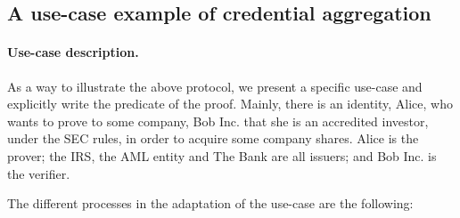 \subsection{A use-case example of credential aggregation}


\paragraph{Use-case description.}
As a way to illustrate the above protocol, we present a specific use-case and explicitly write the predicate of the proof. Mainly, there is an identity, Alice, who wants to prove to some company, Bob Inc. that she is an accredited investor, under the SEC rules, in order to acquire some company shares. Alice is the prover; the IRS, the AML entity and The Bank are all issuers; and Bob Inc. is the verifier.

The different processes in the adaptation of the use-case are the following:

